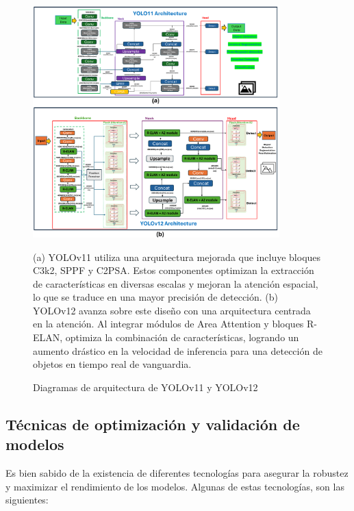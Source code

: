 \documentclass[12pt,a4paper,onecolumn,oneside]{report}
\begin{document}
\begin{figure}[htbp]
  \centering
  \includegraphics[width=0.85\textwidth]{figuras/arquitecture YOLO/v11_v12.png}
  \caption{Diagramas de arquitectura de YOLOv11 y YOLOv12}
  \label{fig:Yolov11_v12_arquitectures}
  (a) YOLOv11 utiliza una arquitectura mejorada que incluye bloques C3k2, SPPF y C2PSA. Estos componentes optimizan la extracción de características en diversas escalas y mejoran la atención espacial, lo que se traduce en una mayor precisión de detección.
  (b) YOLOv12 avanza sobre este diseño con una arquitectura centrada en la atención. Al integrar módulos de Area Attention y bloques R-ELAN, optimiza la combinación de características, logrando un aumento drástico en la velocidad de inferencia para una detección de objetos en tiempo real de vanguardia.
\end{figure}

\subsection{Técnicas de optimización y validación de modelos}

Es bien sabido de la existencia de diferentes tecnologías para asegurar la robustez y maximizar el rendimiento de los modelos. Algunas de estas tecnologías, son las siguientes:
\end{document}
